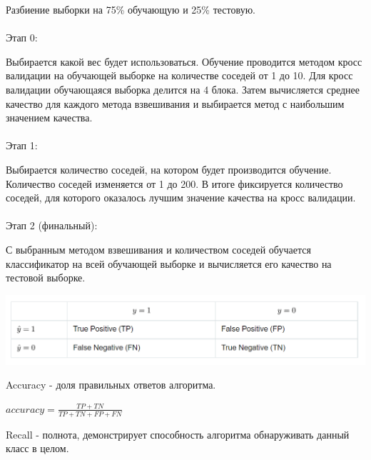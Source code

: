 \documentclass[a4paper,titlepage]{article}
\begin{document}
Разбиение выборки на 75\% обучающую и 25\% тестовую.
\\
\\
Этап 0:

Выбирается какой вес будет использоваться. Обучение проводится методом кросс валидации на обучающей выборке на количестве соседей от 1 до 10. Для кросс валидации обучающаяся выборка делится на 4 блока. Затем вычисляется среднее качество для каждого метода взвешивания и выбирается метод с наибольшим значением качества.
\\
\\
Этап 1:

Выбирается количество соседей, на котором будет производится обучение. Количество соседей изменяется от 1 до 200. В итоге фиксируется количество соседей, для которого оказалось лучшим значение качества на кросс валидации.
\\
\\
Этап 2 (финальный):

С выбранным методом взвешивания и количеством соседей обучается классификатор на всей обучающей выборке и вычисляется его качество на тестовой выборке.
\newpage




\includegraphics[scale = 1]{errors}

Accuracy - доля правильных ответов алгоритма.

\begin{center}
{$accuracy = \frac{TP + TN}{TP + TN + FP + FN}$}
\end{center}

Recall - полнота, демонстрирует способность алгоритма обнаруживать данный класс в целом.
\end{document}
